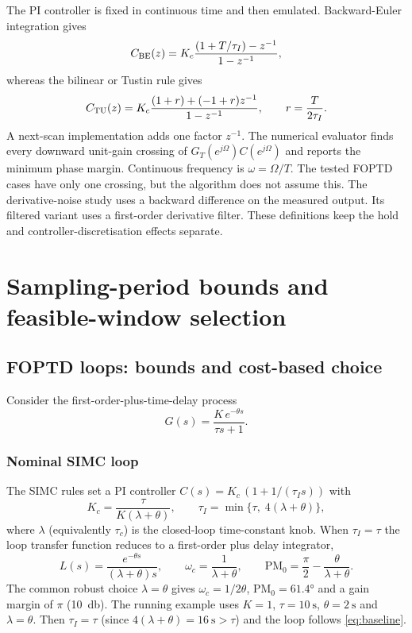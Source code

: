 \documentclass[a4paper,fleqn]{cas-sc}
\theoremstyle{remark}
\newcommand{\wc}{\omega_c}
\begin{document}
The PI controller is fixed in continuous time and then emulated. Backward-Euler integration gives
\begin{equation}
C_{\rm BE}(z)=K_c\frac{(1+T/\tau_I)-z^{-1}}{1-z^{-1}},
\label{eq:pi-be}
\end{equation}
whereas the bilinear or Tustin rule gives
\begin{equation}
C_{\rm TU}(z)=K_c\frac{(1+r)+(-1+r)z^{-1}}{1-z^{-1}},
\qquad r=\frac{T}{2\tau_I}.
\label{eq:pi-tu}
\end{equation}
A next-scan implementation adds one factor $z^{-1}$. The numerical evaluator finds every downward unit-gain crossing of $G_T(e^{j\Omega})C(e^{j\Omega})$ and reports the minimum phase margin. Continuous frequency is $\omega=\Omega/T$. The tested FOPTD cases have only one crossing, but the algorithm does not assume this. The derivative-noise study uses a backward difference on the measured output. Its filtered variant uses a first-order derivative filter. These definitions keep the hold and controller-discretisation effects separate.

\section{Sampling-period bounds and feasible-window selection}
\label{sec:bounds}

\subsection{FOPTD loops: bounds and cost-based choice}
\label{sec:foptd}
Consider the first-order-plus-time-delay process
\begin{equation}
G(s)=\frac{K\,e^{-\theta s}}{\tau s + 1}.
\label{eq:foptd}
\end{equation}

\subsubsection{Nominal SIMC loop}
The SIMC rules \citep{skogestad2003simc} set a PI controller
$C(s)=K_c\,(1+1/(\tau_I s))$ with
\begin{equation}
K_c=\frac{\tau}{K(\lambda+\theta)},\qquad
\tau_I=\min\{\tau,\;4(\lambda+\theta)\},
\label{eq:simc}
\end{equation}
where $\lambda$ (equivalently $\tau_c$) is the closed-loop time-constant knob.
When $\tau_I=\tau$ the loop transfer function reduces to a first-order plus
delay integrator,
\begin{equation}
L(s)=\frac{e^{-\theta s}}{(\lambda+\theta)s},\qquad
\wc=\frac{1}{\lambda+\theta},\qquad
\mathrm{PM}_0=\frac{\pi}{2}-\frac{\theta}{\lambda+\theta}.
\label{eq:baseline}
\end{equation}
The common robust choice $\lambda=\theta$ gives $\wc=1/2\theta$,
$\mathrm{PM}_0=\ang{61.4}$ and a gain margin of $\pi$
(\SI{10}{\decibel}). The running example uses $K=1$,
$\tau=\SI{10}{\second}$, $\theta=\SI{2}{\second}$ and $\lambda=\theta$. Then
$\tau_I=\tau$ (since $4(\lambda+\theta)=\SI{16}{\second}>\tau$) and the loop
follows \cref{eq:baseline}.
\end{document}
